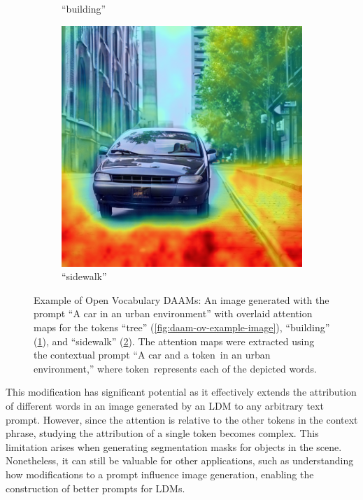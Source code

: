 \begin{figure}
\begin{subfigure}{0.30\columnwidth}
   \caption{``building''}
   \label{fig:daam-ov-example-image-1}
  \end{subfigure}
  \begin{subfigure}{0.30\columnwidth}
   \includegraphics[width=\columnwidth]{img/3-methodology/example_ov_daam_heatmap_sidewalk_without_special_tokens.png}
   \caption{``sidewalk''}
   \label{fig:daam-ov-example-image-2}
  \end{subfigure}
  \caption[Example of Open Vocabulary DAAMs]{Example of Open Vocabulary DAAMs: An image generated with the prompt ``A car in an urban environment'' with overlaid attention maps for the tokens ``tree'' (\ref{fig:daam-ov-example-image}), ``building'' (\ref{fig:daam-ov-example-image-1}), and ``sidewalk'' (\ref{fig:daam-ov-example-image-2}). The attention maps were extracted using the contextual prompt ``A car and a \textlangle token\textrangle\ in an urban environment,'' where \textlangle token\textrangle\ represents each of the depicted words.}
  \label{fig:daam-ov-example-softmax}
  \end{figure}


This modification has significant potential as it effectively extends the attribution of different words in an image generated by an LDM to any arbitrary text prompt. However, since the attention is relative to the other tokens in the context phrase, studying the attribution of a single token becomes complex. This limitation arises when generating segmentation masks for objects in the scene. Nonetheless, it can still be valuable for other applications, such as understanding how modifications to a prompt influence image generation, enabling the construction of better prompts for LDMs.

